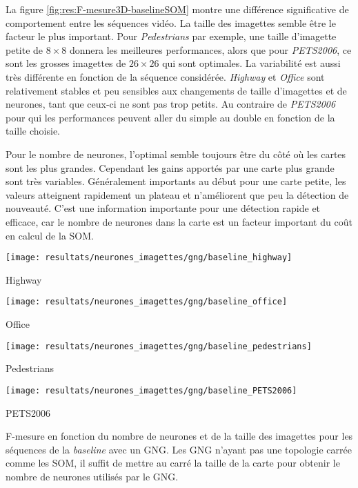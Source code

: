 	La figure \ref{fig:res:F-mesure3D-baselineSOM} montre une différence significative de comportement entre les séquences vidéo. La taille des imagettes semble être le facteur le plus important. Pour \textit{Pedestrians} par exemple, une taille d'imagette petite de $8\times8$ donnera les meilleures performances, alors que pour \textit{PETS2006}, ce sont les grosses imagettes de $26\times26$ qui sont optimales. La variabilité est aussi très différente en fonction de la séquence considérée. \textit{Highway} et \textit{Office} sont relativement stables et peu sensibles aux changements de taille d'imagettes et de neurones, tant que ceux-ci ne sont pas trop petits. Au contraire de \textit{PETS2006} pour qui les performances peuvent aller du simple au double en fonction de la taille choisie.

	Pour le nombre de neurones, l'optimal semble toujours être du côté où les cartes sont les plus grandes. Cependant les gains apportés par une carte plus grande sont très variables. Généralement importants au début pour une carte petite, les valeurs atteignent rapidement un plateau et n'améliorent que peu la détection de nouveauté. C'est une information importante pour une détection rapide et efficace, car le nombre de neurones dans la carte est un facteur important du coût en calcul de la SOM.

	\begin{figureth}
		\begin{subfigureth}{.49\textwidth}
			\texttt{[image: resultats/neurones\_imagettes/gng/baseline\_highway]}\caption{Highway}
		\end{subfigureth}
		\begin{subfigureth}{.49\textwidth}
			\texttt{[image: resultats/neurones\_imagettes/gng/baseline\_office]}\caption{Office}
		\end{subfigureth}
		\begin{subfigureth}{.49\textwidth}
			\texttt{[image: resultats/neurones\_imagettes/gng/baseline\_pedestrians]}\caption{Pedestrians}
		\end{subfigureth}
		\begin{subfigureth}{.49\textwidth}
			\texttt{[image: resultats/neurones\_imagettes/gng/baseline\_PETS2006]}\caption{PETS2006}
		\end{subfigureth}
		\caption[F-mesure en fonction du nombre de neurones et de la taille des imagettes, GNG baseline]{F-mesure en fonction du nombre de neurones et de la taille des imagettes pour les séquences de la \textit{baseline} avec un GNG. Les GNG n'ayant pas une topologie carrée comme les SOM, il suffit de mettre au carré la taille de la carte pour obtenir le nombre de neurones utilisés par le GNG.}\label{fig:res:F-mesure3D-baselineGNG}
	\end{figureth}

